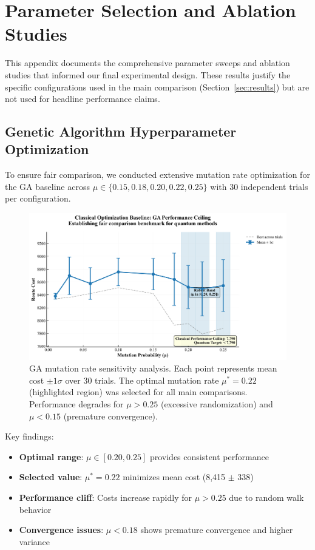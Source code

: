\section{Parameter Selection and Ablation Studies}
\label{sec:appendix_parameters}

This appendix documents the comprehensive parameter sweeps and ablation studies that informed our final experimental design. These results justify the specific configurations used in the main comparison (Section~\ref{sec:results}) but are not used for headline performance claims.

\subsection{Genetic Algorithm Hyperparameter Optimization}
\label{sec:appendix_ga_tuning}

To ensure fair comparison, we conducted extensive mutation rate optimization for the GA baseline across $\mu \in \{0.15, 0.18, 0.20, 0.22, 0.25\}$ with 30 independent trials per configuration.

\begin{figure}[h]
  \centering
  \includegraphics[width=0.8\linewidth]{figures/01_ga_mutation_sweep.png}
  \caption{GA mutation rate sensitivity analysis. Each point represents mean cost $\pm 1\sigma$ over 30 trials. The optimal mutation rate $\mu^* = 0.22$ (highlighted region) was selected for all main comparisons. Performance degrades for $\mu > 0.25$ (excessive randomization) and $\mu < 0.15$ (premature convergence).}
  \label{fig:ga_mutation_sweep}
\end{figure}

Key findings:
\begin{itemize}
    \item \textbf{Optimal range}: $\mu \in [0.20, 0.25]$ provides consistent performance
    \item \textbf{Selected value}: $\mu^* = 0.22$ minimizes mean cost (8,415 $\pm$ 338)
    \item \textbf{Performance cliff}: Costs increase rapidly for $\mu > 0.25$ due to random walk behavior
    \item \textbf{Convergence issues}: $\mu < 0.18$ shows premature convergence and higher variance
\end{itemize}

